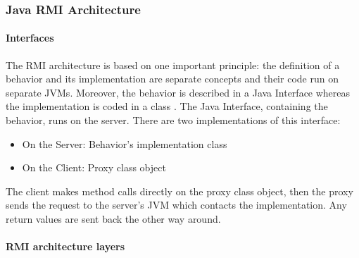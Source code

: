 \subsubsection{Java RMI Architecture} 
\label{JavaRMIArchitecture}

\paragraph{Interfaces}
\label{JavaRMIinterfaces}
The RMI architecture is based on one important principle: the definition of a behavior and its implementation are separate concepts and their code run on separate JVMs. Moreover, the behavior is described in a Java Interface whereas the implementation is coded in a class \cite{RMI-art5}.
The Java Interface, containing the behavior, runs on the server. There are two implementations of this interface:
\begin{itemize}
	\item On the Server: Behavior's implementation class
	\item On the Client: Proxy class object
\end{itemize}

The client makes method calls directly on the proxy class object, then the proxy sends the request to the server's JVM which contacts the implementation. Any return values are sent back the other way around.

\paragraph{RMI architecture layers}
\label{RMIarchitectureLayers}

